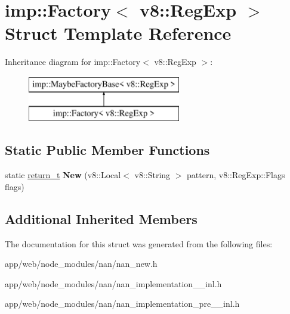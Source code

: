 \hypertarget{structimp_1_1_factory_3_01v8_1_1_reg_exp_01_4}{}\section{imp\+:\+:Factory$<$ v8\+:\+:Reg\+Exp $>$ Struct Template Reference}
\label{structimp_1_1_factory_3_01v8_1_1_reg_exp_01_4}
Inheritance diagram for imp\+:\+:Factory$<$ v8\+:\+:Reg\+Exp $>$\+:\begin{figure}[H]
\begin{center}
\leavevmode
\includegraphics[height=2.000000cm]{structimp_1_1_factory_3_01v8_1_1_reg_exp_01_4}
\end{center}
\end{figure}
\subsection*{Static Public Member Functions}
\begin{DoxyCompactItemize}
\item 
\mbox{\label{structimp_1_1_factory_3_01v8_1_1_reg_exp_01_4_a9c087238868682e18ca9c33600641378}} 
static \hyperlink{class_maybe_local}{return\+\_\+t} {\bfseries New} (v8\+::\+Local$<$ v8\+::\+String $>$ pattern, v8\+::\+Reg\+Exp\+::\+Flags flags)
\end{DoxyCompactItemize}
\subsection*{Additional Inherited Members}


The documentation for this struct was generated from the following files\+:\begin{DoxyCompactItemize}
\item 
app/web/node\+\_\+modules/nan/nan\+\_\+new.\+h\item 
app/web/node\+\_\+modules/nan/nan\+\_\+implementation\+\_\+\_\+inl.\+h\item 
app/web/node\+\_\+modules/nan/nan\+\_\+implementation\+\_\+pre\+\_\+\_\+inl.\+h\end{DoxyCompactItemize}
